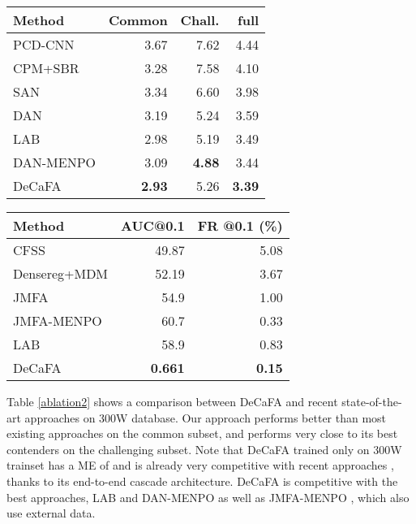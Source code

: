 \documentclass[10pt,twocolumn,letterpaper]{article}
\begin{document}
\begin{table*}[ht]
\centering
\begin{minipage}{0.5\textwidth}
\centering
\caption{Mean error (ME \%) comparison on 300W (lower is better).}
	\label{ablation2}
	\begin{tabular}{l|r|r|r}
		\hline
		Method & Common & Chall. & full \\
		\hline
		PCD-CNN \cite{kumar2018disentangling} & 3.67&7.62&4.44\\
		CPM+SBR \cite{dong2018supervision}&3.28&7.58&4.10\\
		SAN \cite{dong2018style} &3.34&6.60&3.98\\
		DAN \cite{kowalski2017deep} & 3.19 & 5.24&3.59\\
		LAB \cite{wu2018look} & 2.98  & 5.19  & 3.49  \\
		DAN-MENPO \cite{kowalski2017deep} & 3.09 & \textbf{4.88} & 3.44\\
		\hline
		DeCaFA & \textbf{2.93}  & 5.26  & \textbf{3.39}  \\
		\hline
	\end{tabular}
\label{labelrepclass}
\end{minipage}\hfill
\begin{minipage}{0.5\textwidth}
\centering
\caption{AUC and Failure rates (FR \%) for a maximum error of 0.1, and comparison with state-of-the-art approaches on 300W.}
	\label{ablation22}
	\begin{tabular}{l|r|r}
		\hline
		Method & AUC@0.1 & FR @0.1 (\%) \\
		\hline
		CFSS \cite{zhu2015face} &49.87&5.08\\
		Densereg+MDM \cite{alp2017densereg} & 52.19 & 3.67\\
		JMFA \cite{deng2017joint} &54.9&1.00\\
		JMFA-MENPO \cite{deng2017joint} &60.7&0.33\\
		LAB \cite{wu2018look} & 58.9  & 0.83    \\
		\hline
		DeCaFA & \textbf{0.661}  & \textbf{0.15}   \\
		\hline
	\end{tabular}
\end{minipage}\hfill
\end{table*}

Table \ref{ablation2} shows a comparison between DeCaFA and recent state-of-the-art approaches on 300W database. Our approach performs better than most existing approaches on the common subset, and performs very close to its best contenders on the challenging subset. Note that DeCaFA trained only on 300W trainset has a ME of  and is already very competitive with recent approaches \cite{kumar2018disentangling,dong2018supervision,dong2018style,kowalski2017deep}, thanks to its end-to-end cascade architecture. DeCaFA is competitive with the best approaches, LAB \cite{wu2018look} and DAN-MENPO \cite{kowalski2017deep} as well as JMFA-MENPO \cite{deng2017joint}, which also use external data.
\end{document}
